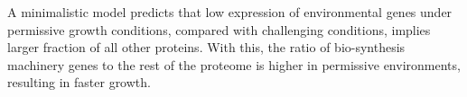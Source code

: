 \label{fig:model}
A minimalistic model predicts that low expression of environmental genes under permissive growth conditions, compared with challenging conditions, implies larger fraction of all other proteins.
With this, the ratio of bio-synthesis machinery genes to the rest of the proteome is higher in permissive environments, resulting in faster growth.
